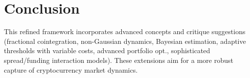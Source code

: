 \documentclass{article}
\begin{document}
\section{Conclusion}

This refined framework incorporates advanced concepts and critique suggestions (fractional cointegration, non-Gaussian dynamics, Bayesian estimation, adaptive thresholds with variable costs, advanced portfolio opt., sophisticated spread/funding interaction models). These extensions aim for a more robust capture of cryptocurrency market dynamics.



\end{document}
